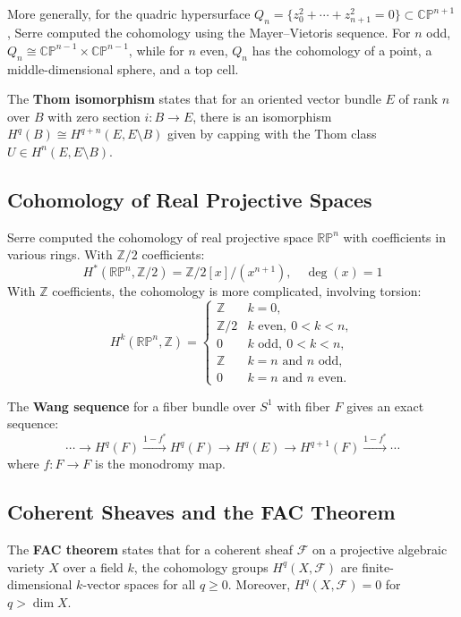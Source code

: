 More generally, for the quadric hypersurface $Q_n = \{z_0^2 + \cdots + z_{n+1}^2 = 0\} \subset \mathbb{CP}^{n+1}$, Serre computed the cohomology using the Mayer--Vietoris sequence. For $n$ odd, $Q_n \cong \mathbb{CP}^{n-1} \times \mathbb{CP}^{n-1}$, while for $n$ even, $Q_n$ has the cohomology of a point, a middle-dimensional sphere, and a top cell.

The \textbf{Thom isomorphism} states that for an oriented vector bundle $E$ of rank $n$ over $B$ with zero section $i: B \to E$, there is an isomorphism $H^q(B) \cong H^{q+n}(E, E \setminus B)$ given by capping with the Thom class $U \in H^n(E, E \setminus B)$.

\subsection{Cohomology of Real Projective Spaces}

Serre computed the cohomology of real projective space $\mathbb{RP}^n$ with coefficients in various rings. With $\mathbb{Z}/2$ coefficients:
\[H^*(\mathbb{RP}^n, \mathbb{Z}/2) = \mathbb{Z}/2[x]/(x^{n+1}), \quad \deg(x) = 1\]
With $\mathbb{Z}$ coefficients, the cohomology is more complicated, involving torsion:
\[H^k(\mathbb{RP}^n, \mathbb{Z}) = \begin{cases} \mathbb{Z} & k = 0, \\ \mathbb{Z}/2 & k \text{ even},\ 0 < k < n, \\ 0 & k \text{ odd},\ 0 < k < n, \\ \mathbb{Z} & k=n\text{ and }n\text{ odd}, \\ 0 & k=n\text{ and }n\text{ even}. \end{cases}\]

The \textbf{Wang sequence} for a fiber bundle over $S^1$ with fiber $F$ gives an exact sequence:
\[\cdots \to H^q(F) \xrightarrow{1 - f^*} H^q(F) \to H^q(E) \to H^{q+1}(F) \xrightarrow{1 - f^*} \cdots\]
where $f: F \to F$ is the monodromy map.

\subsection{Coherent Sheaves and the FAC Theorem}

The \textbf{FAC theorem} states that for a coherent sheaf $\mathcal{F}$ on a projective algebraic variety $X$ over a field $k$, the cohomology groups $H^q(X, \mathcal{F})$ are finite-dimensional $k$-vector spaces for all $q \geq 0$. Moreover, $H^q(X, \mathcal{F}) = 0$ for $q > \dim X$.

